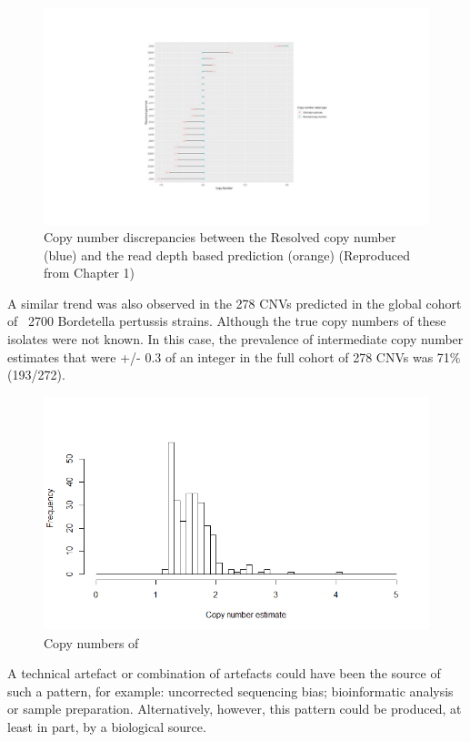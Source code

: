 \documentclass{article}
\begin{document}
\begin{figure}[h!]
\centering
\includegraphics[width=\textwidth{}]{Chapter_1/copy number comparison.jpg}
\caption{ Copy number discrepancies between the Resolved copy number (blue) and the read depth based prediction (orange) (Reproduced from Chapter 1)}
\label{fig:CDC_discrep}
\end{figure}


A similar trend was also observed in the 278 CNVs predicted in the global cohort of ~2700 Bordetella pertussis strains. Although the true copy numbers of these isolates were not known. In this case, the prevalence of  intermediate copy number estimates that were +/- 0.3 of an integer in the full cohort of 278 CNVs was 71\% (193/272).
\begin{figure}[h!]
\centering
\includegraphics[width=\textwidth{}]{Chapter_2/Rplot.png}
\caption{ Copy numbers of }
\label{fig:Full_data_discrep}
\end{figure}

A technical artefact or combination of artefacts could have been the source of such a pattern, for example: uncorrected sequencing bias; bioinformatic analysis or sample preparation. Alternatively, however, this pattern could be produced, at least in part, by a biological source.
\end{document}
